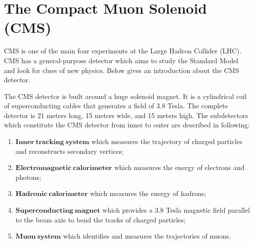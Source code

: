 \section{The Compact Muon Solenoid (CMS)}

CMS is one of the main four experiments at the Large Hadron Collider (LHC). CMS has a general-purpose detector which aims to study the Standard Model and look
for clues of new physics. Below gives an introduction about the CMS detector.

The CMS detector is built around a huge solenoid magnet. It is a cylindrical coil of superconducting cables that generates a field of 3.8 Tesla. The complete detector is 21 meters long, 15 meters wide, and 15 meters high. The subdetectors which constitute the CMS detector from inner to outer are described in following:

\begin{enumerate}
\item $\mathbf{Inner~tracking~system}$ which measures the trajectory of charged particles and reconstructs secondary vertices;
\item $\mathbf{Electromagnetic~calorimeter}$ which measures the energy of electrons and photons;
\item $\mathbf{Hadronic~calorimeter}$ which measures the energy of hadrons;
\item $\mathbf{Superconducting~magnet}$ which provides a 3.8 Tesla magnetic field parallel to the beam axis to bend the tracks of charged particles;
\item $\mathbf{Muon~system}$ which identifies and measures the trajectories of muons.
\end{enumerate} 

